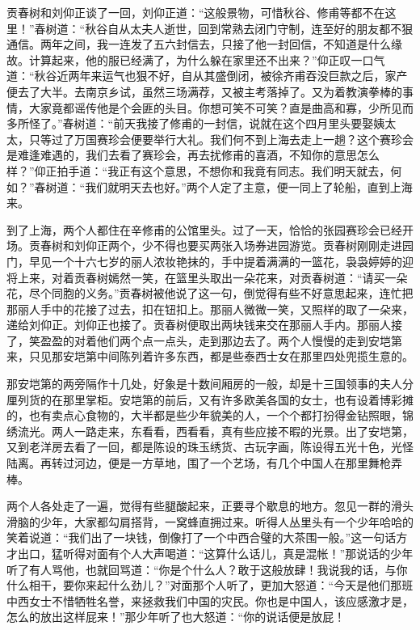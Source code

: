 \documentclass[12pt,UTF8]{ctexbook}
\begin{document}
{{{贡春树和刘仰正谈了一回，刘仰正道：“这般景物，可惜秋谷、修甫等都不在这里！”春树道：“秋谷自从太夫人逝世，回到常熟去闭门守制，连至好的朋友都不狠通信。两年之间，我一连发了五六封信去，只接了他一封回信，不知道是什么缘故。计算起来，他的服已经满了，为什么躲在家里还不出来？”仰正叹一口气道：“秋谷近两年来运气也狠不好，自从其盛倒闭，被徐齐甫吞没巨款之后，家产便去了大半。去南京乡试，虽然三场满荐，又被主考落掉了。又为着教演拳棒的事情，大家竟都谣传他是个会匪的头目。你想可笑不可笑？直是曲高和寡，少所见而多所怪了。”春树道：“前天我接了修甫的一封信，说就在这个四月里头要娶姨太太，只等过了万国赛珍会便要举行大礼。我们何不到上海去走上一趟？这个赛珍会是难逢难遇的，我们去看了赛珍会，再去扰修甫的喜酒，不知你的意思怎么样？”仰正拍手道：“我正有这个意思，不想你和我竟有同志。我们明天就去，何如？”春树道：“我们就明天去也好。”两个人定了主意，便一同上了轮船，直到上海来。

到了上海，两个人都住在辛修甫的公馆里头。过了一天，恰恰的张园赛珍会已经开场。贡春树和刘仰正两个，少不得也要买两张入场券进园游览。贡春树刚刚走进园门，早见一个十六七岁的丽人浓妆艳抹的，手中提着满满的一篮花，袅袅婷婷的迎将上来，对着贡春树嫣然一笑，在篮里头取出一朵花来，对贡春树道：“请买一朵花，尽个同胞的义务。”贡春树被他说了这一句，倒觉得有些不好意思起来，连忙把那丽人手中的花接了过去，扣在钮扣上。那丽人微微一笑，又照样的取了一朵来，递给刘仰正。刘仰正也接了。贡春树便取出两块钱来交在那丽人手内。那丽人接了，笑盈盈的对着他们两个点一点头，走到那边去了。两个人慢慢的走到安垲第来，只见那安垲第中间陈列着许多东西，都是些泰西士女在那里四处兜揽生意的。

那安垲第的两旁隔作十几处，好象是十数间厢房的一般，却是十三国领事的夫人分厘列货的在那里掌柜。安垲第的前后，又有许多欧美各国的女士，也有设着博彩摊的，也有卖点心食物的，大半都是些少年貌美的人，一个个都打扮得金钻照眼，锦绣流光。两人一路走来，东看看，西看看，真有些应接不暇的光景。出了安垲第，又到老洋房去看了一回，都是陈设的珠玉绣货、古玩字画，陈设得五光十色，光怪陆离。再转过河边，便是一方草地，围了一个艺场，有几个中国人在那里舞枪弄棒。

两个人各处走了一遍，觉得有些腿酸起来，正要寻个歇息的地方。忽见一群的滑头滑脑的少年，大家都勾肩搭背，一窝蜂直拥过来。听得人丛里头有一个少年哈哈的笑着说道：“我们出了一块钱，倒像打了一个中西合璧的大茶围一般。”这一句话方才出口，猛听得对面有个人大声喝道：“这算什么话儿，真是混帐！”那说话的少年听了有人骂他，也就回骂道：“你是个什么人？敢于这般放肆！我说我的话，与你什么相干，要你来起什么劲儿？”对面那个人听了，更加大怒道：“今天是他们那班中西女士不惜牺牲名誉，来拯救我们中国的灾民。你也是中国人，该应感激才是，怎么的放出这样屁来！”那少年听了也大怒道：“你的说话便是放屁！

}}}
\end{document}
